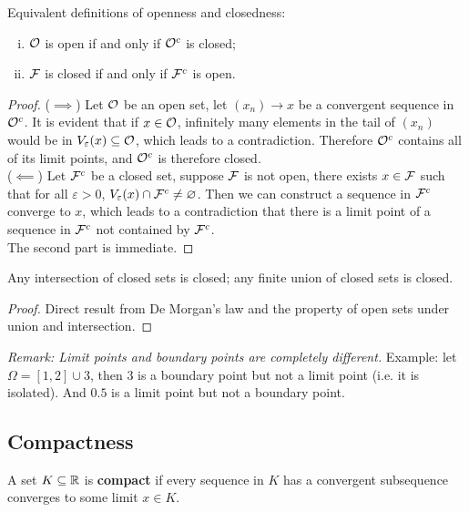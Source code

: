 \documentclass[11pt]{article}
\begin{document}
	\begin{theorem} Equivalent definitions of openness and closedness:
		\begin{enumerate}[(i)]
			\item $\mathcal{{O}}$ is open if and only if $\mathcal{{O}}^c$ is closed;
			\item $\mathcal{{F}}$ is closed if and only if $\mathcal{{F}}^c$ is open.
		\end{enumerate}
	\end{theorem}
	
	\begin{proof}
		($\implies$) Let $\mathcal{{O}}$ be an open set, let $(x_n) \to x$ be a convergent sequence in $\mathcal{{O}}^c$. It is evident that if $x \in \mathcal{{O}}$, infinitely many elements in the tail of $(x_n)$ would be in $V_\varepsilon(x) \subseteq \mathcal{{O}}$, which leads to a contradiction. Therefore $\mathcal{{O}}^c$ contains all of its limit points, and $\mathcal{{O}}^c$ is therefore closed.
		\\($\impliedby$) Let $\mathcal{{F}}^c$ be a closed set, suppose $\mathcal{{F}}$ is not open, there exists $x \in \mathcal{{F}}$ such that for all $\varepsilon > 0$, $V_\varepsilon(x) \cap \mathcal{{F}}^c \neq \varnothing$. Then we can construct a sequence in $\mathcal{{F}}^c$ converge to $x$, which leads to a contradiction that there is a limit point of a sequence in $\mathcal{{F}}^c$ not contained by $\mathcal{{F}}^c$. \\
		The second part is immediate.
	\end{proof}
	
	\begin{theorem}
		Any intersection of closed sets is closed; any finite union of closed  sets is closed.
	\end{theorem}
	
	\begin{proof}
		Direct result from De Morgan's law and the property of open sets under union and intersection.
	\end{proof}
	
	\emph{Remark: Limit points and boundary points are completely different.} Example: let $\Omega = [1, 2] \cup {3}$, then $3$ is a boundary point but not a limit point (i.e. it is isolated). And $0.5$ is a limit point but not a boundary point.
	
	\subsection{Compactness}
	\begin{definition}
		A set $K \subseteq \mathbb{R}$ is \textbf{compact} if every sequence in $K$ has a convergent subsequence converges to some limit $x \in K$.
	\end{definition}
	
\end{document}
